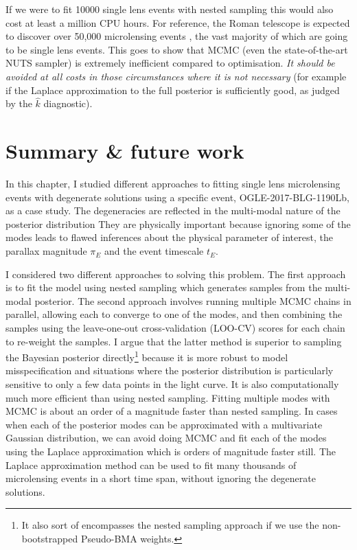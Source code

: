 \documentclass[12pt,dvipsnames]{report}
\begin{document}
If we were to fit 10000 single lens events with nested sampling this would also cost 
at least a million CPU hours. For reference, the Roman telescope is expected to 
discover over 50,000 microlensing events \citep{2020AJ....160..123J}, the vast majority 
of which are going to be single lens events.
This goes to show that MCMC (even the state-of-the-art
NUTS sampler) is extremely inefficient compared to optimisation.
\emph{It should be avoided 
at all costs in those circumstances where it is not necessary} (for example if 
the Laplace approximation to the full posterior is sufficiently good, as judged by the 
$\hat k$ diagnostic).

\section{Summary \& future work}
\label{sec:conclusions_single_lens}
In this chapter, I studied different approaches to fitting single lens microlensing 
events with degenerate solutions using a specific event, OGLE-2017-BLG-1190Lb, as a case study.  
The degeneracies are reflected in the multi-modal nature of the posterior distribution
They are physically important
because ignoring some of the modes leads to flawed inferences about the physical parameter 
of interest, the parallax magnitude $\pi_E$ and the event timescale $t_E$.

I considered two  different approaches to solving this problem. The first approach is to fit 
the model using nested sampling which generates samples from the multi-modal posterior.
The second approach involves running multiple MCMC chains in parallel, allowing each to converge 
to one of the modes, and then combining the samples using the leave-one-out cross-validation 
(LOO-CV) scores for each chain to re-weight the samples. 
I argue that the latter method is superior to sampling the Bayesian posterior directly\footnote{
    It also sort of encompasses the nested sampling approach if we use the 
    non-bootstrapped Pseudo-BMA weights.
} because it is more robust to model misspecification and situations where the posterior 
distribution is particularly sensitive to only a few data points in the light curve.
It is also computationally much more efficient than using nested sampling.
Fitting multiple modes with MCMC is about an order of a magnitude faster 
than nested sampling. In cases when each of the posterior modes can be approximated 
with a multivariate Gaussian distribution, we can avoid doing MCMC and fit each of the modes
using the Laplace approximation which is orders of magnitude faster still.
The Laplace approximation method can be used to fit many thousands of 
microlensing events in a short time span, without ignoring the degenerate solutions. 
\end{document}

